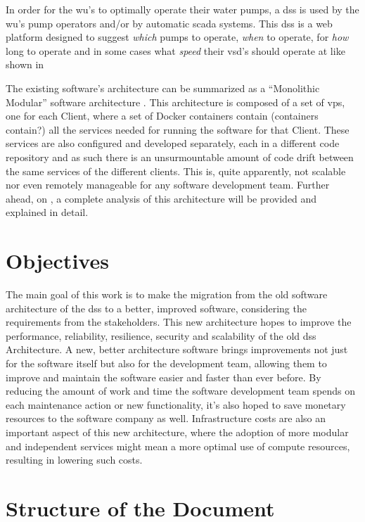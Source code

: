 In order for the \gls{wu}'s to optimally operate their water pumps, a \gls{dss} is used by the \gls{wu}'s pump operators and/or by automatic \gls{scada} systems. This \gls{dss} is a web platform designed to suggest \textit{which} pumps to operate, \textit{when} to operate, for \textit{how} long to operate and in some cases what \textit{speed} their \gls{vsd}'s should operate at like shown in 

The existing software’s architecture can be summarized as a “Monolithic Modular” software architecture \parencite{newman2019monolith}. This architecture is composed of a set of \gls{vps}, one for each Client, where a set of Docker containers contain (containers contain?) all the services needed for running the software for that Client. These services are also configured and developed separately, each in a different code repository and as such there is an unsurmountable amount of code drift between the same services of the different clients. This is, quite apparently, not scalable nor even remotely manageable for any software development team. Further ahead, on , a complete analysis of this architecture will be provided and explained in detail.

\section{Objectives}
\label{intro:s:objectives}

The main goal of this work is to make the migration from the old software architecture of the \gls{dss} to a better, improved software, considering the requirements from the stakeholders.
This new architecture hopes to improve the performance, reliability, resilience, security and scalability of the old \gls{dss} Architecture. A new, better architecture software brings improvements not just for the software itself but also for the development team, allowing them to improve and maintain the software easier and faster than ever before. By reducing the amount of work and time the software development team spends on each maintenance action or new functionality, it’s also hoped to save monetary resources to the software company as well. Infrastructure costs are also an important aspect of this new architecture, where the adoption of more modular and independent services might mean a more optimal use of compute resources, resulting in lowering such costs.


\section{Structure of the Document}
\label{intro:s:structure-of-the-document}

